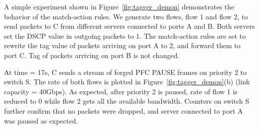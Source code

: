   A simple experiment shown in
Figure~\ref{fig:tagger_demon} demonstrates the behavior of the match-action
rules.  We generate two flows, flow 1 and flow 2, to send packets to C from
different servers connected to ports A and B. Both servers set the DSCP value in
outgoing packets to 1. The match-action rules are set to rewrite the tag value
of packets arriving on port A to 2, and forward them to port C. Tag of packets
arriving on port B is not changed.

At time = 17s, C sends a stream of forged PFC PAUSE frames on priority 2 to
switch S. The rate of both flows is plotted in Figure~\ref{fig:tagger_demon}(b)
(link capacity = 40Gbps). As expected, after priority 2 is paused, rate of
flow 1 is reduced to 0 while flow 2 gets all the available bandwidth.
Counters on switch S further confirm that no packets were dropped, and server
connected to port A was paused as expected.
